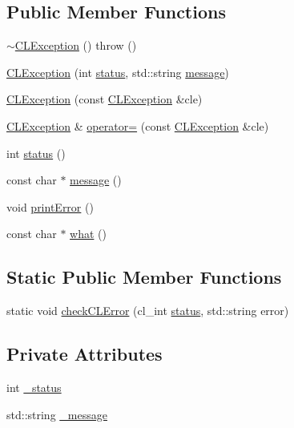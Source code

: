 \subsection*{Public Member Functions}
\begin{DoxyCompactItemize}
\item 
\hyperlink{class_c_l_exception_a22033255f193444c7038dd3ed1314c3e}{$\sim$\-C\-L\-Exception} ()  throw ()
\item 
\hyperlink{class_c_l_exception_a24089a34df64c03ae5b90818dd8598ec}{C\-L\-Exception} (int \hyperlink{class_c_l_exception_a08feb7c76971320d736c4137a03013bb}{status}, std\-::string \hyperlink{class_c_l_exception_afaeb1a33cb858c0faa74fa6538a97dc5}{message})
\item 
\hyperlink{class_c_l_exception_a89c27aa8b28775ffd8e52c708bcc6fa0}{C\-L\-Exception} (const \hyperlink{class_c_l_exception}{C\-L\-Exception} \&cle)
\item 
\hyperlink{class_c_l_exception}{C\-L\-Exception} \& \hyperlink{class_c_l_exception_a735f300c25668ba7c00e1a83c0c0dca3}{operator=} (const \hyperlink{class_c_l_exception}{C\-L\-Exception} \&cle)
\item 
int \hyperlink{class_c_l_exception_a08feb7c76971320d736c4137a03013bb}{status} ()
\item 
const char $\ast$ \hyperlink{class_c_l_exception_afaeb1a33cb858c0faa74fa6538a97dc5}{message} ()
\item 
void \hyperlink{class_c_l_exception_a0c1d6917db38876465e60f1404e589d3}{print\-Error} ()
\item 
const char $\ast$ \hyperlink{class_c_l_exception_a8275eb0a5a0ac4ab0de4bad4b0130d0e}{what} ()
\end{DoxyCompactItemize}
\subsection*{Static Public Member Functions}
\begin{DoxyCompactItemize}
\item 
static void \hyperlink{class_c_l_exception_a499ceca093813dcd2e731f542b1e078e}{check\-C\-L\-Error} (cl\-\_\-int \hyperlink{class_c_l_exception_a08feb7c76971320d736c4137a03013bb}{status}, std\-::string error)
\end{DoxyCompactItemize}
\subsection*{Private Attributes}
\begin{DoxyCompactItemize}
\item 
int \hyperlink{class_c_l_exception_aa8b72fb16bc1bbd38c28bc2bbc4fee28}{\-\_\-status}
\item 
std\-::string \hyperlink{class_c_l_exception_a05349664de93edb8e6379f67fe63a9e2}{\-\_\-message}
\end{DoxyCompactItemize}


